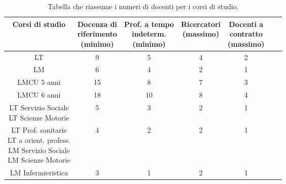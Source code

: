 \begin{table}[h!]
    \centering
    \renewcommand{\arraystretch}{1.8}
    \begin{tabular}{|c|c|c|c|c|c|c|}
    \hline
    Corsi di studio & \makecell{Docenza di \\riferimento \\(\textbf{minimo})} & \makecell{Prof. a tempo\\indeterm.\\(\textbf{minimo})} & \makecell{Ricercatori\\(\textbf{massimo})} & \makecell{Docenti a\\contratto\\(\textbf{massimo})} \\
    \hline
    LT & 9 & 5 & 4 & 2 \\
    \hline 
    LM & 6 & 4 & 2 & 1 \\
    \hline
    LMCU 5 anni & 15 & 8 & 7 & 3 \\
    \hline
    LMCU 6 anni & 18 & 10 & 8 & 4 \\
    \hline
    \makecell{LT Servizio Sociale\\LT Scienze Motorie} & 5 & 3 & 2 & 1 \\
    \hline
    \makecell{LT Prof. sanitarie\\LT a orient. profess.\\LM Servizio Sociale\\LM Scienze Motorie} & 4 & 2 & 2 & 1 \\
    \hline
    LM Infermieristica & 3 & 1 & 2 & 1 \\
    \hline
    \end{tabular}
    \caption{Tabella che riassume i numeri di docenti per i corsi di studio.}
    \label{tab:casi-particolari}
\end{table}
    
